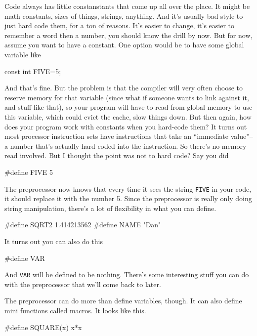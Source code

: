 \documentclass[ebook,11pt,oneside,openany]{memoir}
\newcommand{\cf}[1]{\texttt{#1}}
\begin{document}
Code always has little constanstants that come up all over the place. It might be math constants, sizes of things, strings, anything. And it's usually bad style to just hard code them, for a ton of reasons. It's easier to change, it's easier to remember a word then a number, you should know the drill by now. But for now, assume you want to have a constant. One option would be to have some global variable like

\begin{code}[language=C]
const int FIVE=5;
\end{code}

\noindent
And that's fine. But the problem is that the compiler will very often choose to reserve memory for that variable (since what if someone wants to link against it, and stuff like that), so your program will have to read from global memory to use this variable, which could evict the cache, slow things down. But then again, how does your program work with constants when you hard-code them? It turns out most processor instruction sets have instructions that take an ``immediate value''--a number that's actually hard-coded into the instruction. So there's no memory read involved. But I thought the point was not to hard code? Say you did 

\begin{code}[language=C]
#define FIVE 5
\end{code}

The preprocessor now knows that every time it sees the string \cf{FIVE} in your code, it should replace it with the number 5. Since the preprocessor is really only doing string manipulation, there's a lot of flexibility in what you can define.

\begin{code}[language=C]
#define SQRT2 1.414213562
#define NAME "Dan"
\end{code}

\noindent
It turns out you can also do this

\begin{code}[language=C]
#define VAR
\end{code}

\noindent
And \cf{VAR} will be defined to be nothing. There's some interesting stuff you can do with the preprocessor that we'll come back to later.

The preprocessor can do more than define variables, though. It can also define mini functions called macros. It looks like this.

\begin{code}[language=C]
#define SQUARE(x) x*x
\end{code}
\end{document}
